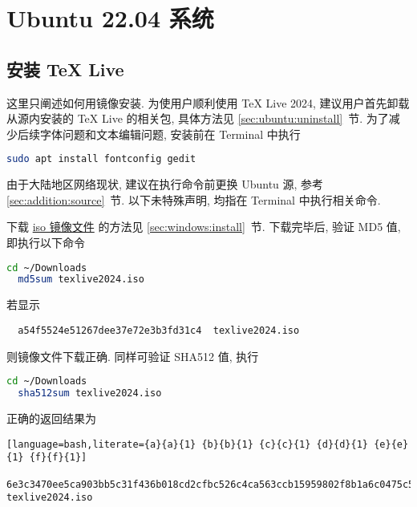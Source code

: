 
\chapter{Ubuntu 22.04 系统}

\section{安装 \TeX{} Live}\label{chap:ubuntu:sec:install}

这里只阐述如何用镜像安装.
为使用户顺利使用 \TeX{} Live 2024,
建议用户首先卸载从源内安装的 \TeX{} Live 的相关包,
具体方法见 \ref{sec:ubuntu:uninstall}~节.
为了减少后续字体问题和文本编辑问题,
安装前在 \textsf{Terminal} 中执行
\begin{lstlisting}[language=bash]
  sudo apt install fontconfig gedit
\end{lstlisting}
由于大陆地区网络现状,
建议在执行命令前更换 Ubuntu 源,
参考 \ref{sec:addition:source}~节.
以下未特殊声明,
均指在  \textsf{Terminal} 中执行相关命令.

下载
\href{https://mirrors.ctan.org/systems/texlive/Images/texlive2024.iso}{iso 镜像文件}
的方法见 \ref{sec:windows:install}~节.
下载完毕后,
验证 MD5 值,
即执行以下命令
\begin{lstlisting}[language = bash]
  cd ~/Downloads
  md5sum texlive2024.iso
\end{lstlisting}
若显示
\begin{lstlisting}
  a54f5524e51267dee37e72e3b3fd31c4  texlive2024.iso
\end{lstlisting}
则镜像文件下载正确.
同样可验证 SHA512 值,
执行
\begin{lstlisting}[language = bash]
  cd ~/Downloads
  sha512sum texlive2024.iso
\end{lstlisting}
正确的返回结果为
\begin{lstlisting}[language=bash,literate={a}{a}{1} {b}{b}{1} {c}{c}{1} {d}{d}{1} {e}{e}{1} {f}{f}{1}]
  6e3c3470ee5ca903bb5c31f436b018cd2cfbc526c4ca563ccb15959802f8b1a6c0475c58566c1afaba19dc780fd192ac5511818ef5a89828d935c66c62cfcb2a  texlive2024.iso
\end{lstlisting}

